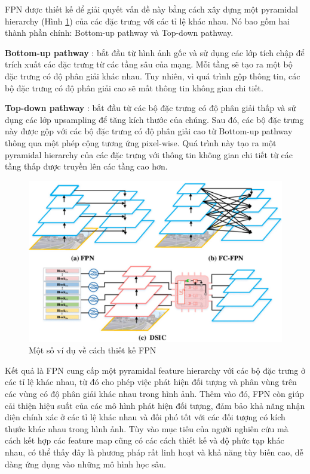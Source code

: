 \documentclass[a4paper]{article}
\begin{document}
FPN được thiết kế để giải quyết vấn đề này bằng cách xây dựng một pyramidal hierarchy (Hình \ref{fig:FPN}) của các đặc trưng với các tỉ lệ khác nhau. Nó bao gồm hai thành phần chính: Bottom-up pathway và Top-down pathway.

\textbf{Bottom-up pathway} : bắt đầu từ hình ảnh gốc và sử dụng các lớp tích chập để trích xuất các đặc trưng từ các tầng sâu của mạng. Mỗi tầng sẽ tạo ra một bộ đặc trưng có độ phân giải khác nhau. Tuy nhiên, vì quá trình gộp thông tin, các bộ đặc trưng có độ phân giải cao sẽ mất thông tin không gian chi tiết.

\textbf{Top-down pathway} : bắt đầu từ các bộ đặc trưng có độ phân giải thấp và sử dụng các lớp upsampling để tăng kích thước của chúng. Sau đó, các bộ đặc trưng này được gộp với các bộ đặc trưng có độ phân giải cao từ Bottom-up pathway thông qua một phép cộng tương ứng pixel-wise. Quá trình này tạo ra một pyramidal hierarchy của các đặc trưng với thông tin không gian chi tiết từ các tầng thấp được truyền lên các tầng cao hơn.

\begin{figure}[h]
	\centering
	\includegraphics[width=0.7\linewidth]{fig/z5092847154512_f4e202b7896c8c37a42ed6fff62626c2}
	\caption{Một số ví dụ về cách thiết kế FPN}
	\label{fig:FPN}
\end{figure}


Kết quả là FPN cung cấp một pyramidal feature hierarchy với các bộ đặc trưng ở các tỉ lệ khác nhau, từ đó cho phép việc phát hiện đối tượng và phân vùng trên các vùng có độ phân giải khác nhau trong hình ảnh. Thêm vào đó, FPN còn giúp cải thiện hiệu suất của các mô hình phát hiện đối tượng, đảm bảo khả năng nhận diện chính xác ở các tỉ lệ khác nhau và đối phó tốt với các đối tượng có kích thước khác nhau trong hình ảnh. Tùy vào mục tiêu của người nghiên cứu mà cách kết hợp các feature map cũng có các cách thiết kế và độ phức tạp khác nhau, có thể thấy đây là phương pháp rất linh hoạt và khả năng tùy biến cao, dễ dàng ứng dụng vào những mô hình học sâu.
\end{document}
